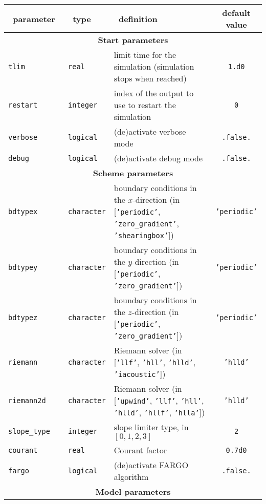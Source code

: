 \documentclass[a4paper,12pt]{article}
\begin{document}
\begin{table}[h!]
  \centering
  {\footnotesize
  \begin{tabular}{l | l | p{} | c }
    ~\hfill parameter\hfill~ & ~\hfill type\hfill~ & ~\hfill definition\hfill~ & default value \\
    \hline
    \hline
    \multicolumn{4}{c}{\normalsize \bfseries Start parameters} \\
    \hline
    \texttt{tlim} & \texttt{real} & limit time for the simulation (simulation stops when reached) & \texttt{1.d0} \\
    \texttt{restart} & \texttt{integer} & index of the output to use to restart the simulation & \texttt{0} \\
    \texttt{verbose} & \texttt{logical} & (de)activate verbose mode & \texttt{.false.} \\
    \texttt{debug} & \texttt{logical} & (de)activate debug mode & \texttt{.false.} \\
    \hline
    \multicolumn{4}{c}{\normalsize \bfseries Scheme parameters} \\
    \hline
    \texttt{bdtypex} & \texttt{character} & boundary conditions in the $x$-direction (in [\texttt{'periodic'}, \texttt{'zero\_gradient'}, \texttt{'shearingbox'}]) & \texttt{'periodic'} \\
    \texttt{bdtypey} & \texttt{character} & boundary conditions in the $y$-direction (in [\texttt{'periodic'}, \texttt{'zero\_gradient'}]) & \texttt{'periodic'} \\
    \texttt{bdtypez} & \texttt{character} & boundary conditions in the $z$-direction (in [\texttt{'periodic'}, \texttt{'zero\_gradient'}]) & \texttt{'periodic'} \\
    \texttt{riemann} & \texttt{character} & Riemann solver (in [\texttt{'llf'}, \texttt{'hll'}, \texttt{'hlld'}, \texttt{'iacoustic'}]) & \texttt{'hlld'} \\
    \texttt{riemann2d} & \texttt{character} & Riemann solver (in [\texttt{'upwind'}, \texttt{'llf'}, \texttt{'hll'}, \texttt{'hlld'}, \texttt{'hllf'}, \texttt{'hlla'}]) & \texttt{'hlld'} \\
    \texttt{slope\_type} & \texttt{integer} & slope limiter type, in $[0,1,2,3]$ & \texttt{2} \\
    \texttt{courant} & \texttt{real} & Courant factor & \texttt{0.7d0} \\
    \texttt{fargo} & \texttt{logical} & (de)activate FARGO algorithm & \texttt{.false.} \\
    \hline
    \multicolumn{4}{c}{\normalsize \bfseries Model parameters} \\
    \hline


\end{tabular}}
\end{table}
\end{document}
